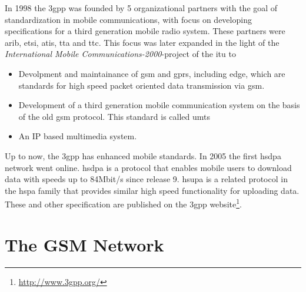 In 1998 the \gls{3gpp} was founded by 5 organizational partners with the goal of standardization in mobile communications, with focus on developing specifications for a third generation mobile radio system.
These partners were \gls{arib}, \gls{etsi}, \gls{atis}, \gls{tta} and \gls{ttc}.
This focus was later expanded in the light of the \emph{International Mobile Communications-2000}-project \cite{3gpp_Proposal2000} of the \gls{itu} to 
\begin{itemize}
	\item Devolpment and maintainance of \gls{gsm} and \gls{gprs}, including \gls{edge}, which are standards for high speed packet oriented data transmission via \gls{gsm}.
	\item Development of a third generation mobile communication system on the basis of the old \gls{gsm} protocol. This standard is called \gls{umts}
	\item An IP based multimedia system.
\end{itemize}
Up to now, the \gls{3gpp} has enhanced mobile standards.
In 2005 the first \gls{hsdpa} network went online.
\gls{hsdpa} \cite{hsdpa} is a protocol that enables mobile users to download data with speeds up to 84Mbit/s since release 9.
\gls{hsupa} \cite{hsupa} is a related protocol in the \gls{hspa} family that provides similar high speed functionality for uploading data.
These and other specification are published on the \gls{3gpp} website\footnote{\url{http://www.3gpp.org/}}.

\section{The GSM Network}
\label{sec:network}

